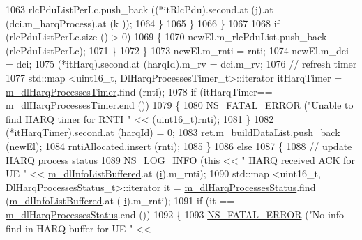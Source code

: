 \begin{DoxyCode}
1063                           rlcPduListPerLc.push\_back ((*itRlcPdu).second.at (j).at (dci.m\_harqProcess).at (k
      ));
1064                         \}
1065                     \}
1066                 \}
1067 
1068               \textcolor{keywordflow}{if} (rlcPduListPerLc.size () > 0)
1069                 \{
1070                   newEl.m\_rlcPduList.push\_back (rlcPduListPerLc);
1071                 \}
1072             \}
1073           newEl.m\_rnti = rnti;
1074           newEl.m\_dci = dci;
1075           (*itHarq).second.at (harqId).m\_rv = dci.m\_rv;
1076           \textcolor{comment}{// refresh timer}
1077           std::map <uint16\_t, DlHarqProcessesTimer\_t>::iterator itHarqTimer = 
      \hyperlink{classns3_1_1TdTbfqFfMacScheduler_a772806188cbe19e816a9eab534733ee1}{m\_dlHarqProcessesTimer}.find (rnti);
1078           \textcolor{keywordflow}{if} (itHarqTimer== \hyperlink{classns3_1_1TdTbfqFfMacScheduler_a772806188cbe19e816a9eab534733ee1}{m\_dlHarqProcessesTimer}.end ())
1079             \{
1080               \hyperlink{group__fatal_ga5131d5e3f75d7d4cbfd706ac456fdc85}{NS\_FATAL\_ERROR} (\textcolor{stringliteral}{"Unable to find HARQ timer for RNTI "} << (uint16\_t)rnti);
1081             \}
1082           (*itHarqTimer).second.at (harqId) = 0;
1083           ret.m\_buildDataList.push\_back (newEl);
1084           rntiAllocated.insert (rnti);
1085         \}
1086       \textcolor{keywordflow}{else}
1087         \{
1088           \textcolor{comment}{// update HARQ process status}
1089           \hyperlink{group__logging_gafbd73ee2cf9f26b319f49086d8e860fb}{NS\_LOG\_INFO} (\textcolor{keyword}{this} << \textcolor{stringliteral}{" HARQ received ACK for UE "} << 
      \hyperlink{classns3_1_1TdTbfqFfMacScheduler_aabf2460c78d16c5202cdcda020ba06dd}{m\_dlInfoListBuffered}.at (\hyperlink{bernuolliDistribution_8m_a6f6ccfcf58b31cb6412107d9d5281426}{i}).m\_rnti);
1090           std::map <uint16\_t, DlHarqProcessesStatus\_t>::iterator it = 
      \hyperlink{classns3_1_1TdTbfqFfMacScheduler_a3d25806fc0b4360d668951f3a6b96b8d}{m\_dlHarqProcessesStatus}.find (\hyperlink{classns3_1_1TdTbfqFfMacScheduler_aabf2460c78d16c5202cdcda020ba06dd}{m\_dlInfoListBuffered}.at (
      \hyperlink{bernuolliDistribution_8m_a6f6ccfcf58b31cb6412107d9d5281426}{i}).m\_rnti);
1091           \textcolor{keywordflow}{if} (it == \hyperlink{classns3_1_1TdTbfqFfMacScheduler_a3d25806fc0b4360d668951f3a6b96b8d}{m\_dlHarqProcessesStatus}.end ())
1092             \{
1093               \hyperlink{group__fatal_ga5131d5e3f75d7d4cbfd706ac456fdc85}{NS\_FATAL\_ERROR} (\textcolor{stringliteral}{"No info find in HARQ buffer for UE "} << 

\end{DoxyCode}
